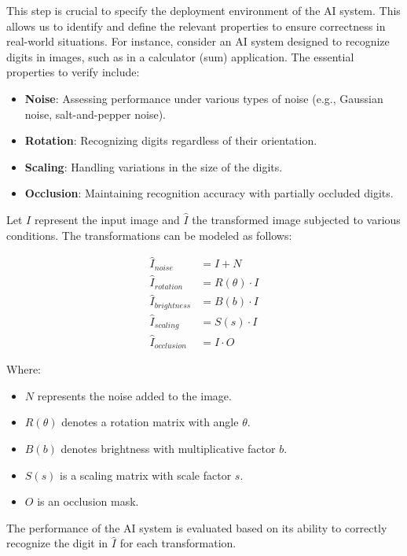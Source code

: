 \documentclass[10pt, conference, a4paper, final]{IEEEtran}
\begin{document}
This step is crucial to specify the deployment environment of the AI system. This allows us to identify and define the relevant properties to ensure correctness in real-world situations. For instance, consider an AI system designed to recognize digits in images, such as in a calculator (sum)  application. The essential properties to verify include:

\begin{itemize}
    \item \textbf{Noise}: Assessing performance under various types of noise (e.g., Gaussian noise, salt-and-pepper noise).
    \item \textbf{Rotation}: Recognizing digits regardless of their orientation.
    \item \textbf{Scaling}: Handling variations in the size of the digits.

    \item \textbf{Occlusion}: Maintaining recognition accuracy with partially occluded digits.

\end{itemize}

Let \( I \) represent the input image and \( \hat{I} \) the transformed image subjected to various conditions. The transformations can be modeled as follows:

\begin{align}
    \hat{I}_{noise} &= I + N \\
    \hat{I}_{rotation} &= R(\theta) \cdot I \\
    \hat{I}_{brightness} &= B(b) \cdot I \\
    \hat{I}_{scaling} &= S(s) \cdot I \\
    \hat{I}_{occlusion} &= I \cdot O 
\end{align}

Where:
\begin{itemize}
    \item \( N \) represents the noise added to the image.
    \item \( R(\theta) \) denotes a rotation matrix with angle \( \theta \).
    \item \( B(b) \) denotes brightness with multiplicative factor \( b \).
    \item \( S(s) \) is a scaling matrix with scale factor \( s \).
    \item \( O \) is an occlusion mask.
\end{itemize}

The performance of the AI system is evaluated based on its ability to correctly recognize the digit in \( \hat{I} \) for each transformation.
\end{document}
